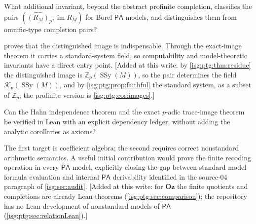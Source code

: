 \documentclass[11pt]{article}
\theoremstyle{definition}
\theoremstyle{remark}
\newcommand{\Oz}{\ensuremath{\mathbf{Oz}}}
\newcommand{\im}{\operatorname{im}}
\newcommand{\Zp}{\mathbb{Z}_p}
\newcommand{\PA}{\mathsf{PA}}
\newcommand{\SSy}{\operatorname{SSy}}
\begin{document}
\begin{question}\label{isg:ptg:q:completions}
What additional invariant, beyond the abstract profinite completion,
classifies the pairs $(\widehat{(R_M)}_p,\im R_M)$ for Borel $\PA$ models,
and distinguishes them from omnific-type completion pairs?
\end{question}
 proves that the distinguished image is
indispensable. Through the exact-image theorem it carries a standard-system
field, so computability and model-theoretic invariants have a direct entry
point. \textup{[}Added at this write: by \cref{isg:ptg:thm:residue} the distinguished image is
$\Zp(\SSy(M))$, so the pair determines the field $\mathcal K_p(\SSy(M))$,
and by \cref{isg:ptg:prop:faithful} the standard system, as a subset of $\Zp$; the profinite
version is \cref{isg:ptg:cor:images}.\textup{]}

\begin{question}\label{isg:ptg:q:lean}
Can the Hahn independence theorem and the exact $p$-adic trace-image
theorem be verified in Lean with an explicit dependency ledger, without
adding the analytic corollaries as axioms?
\end{question}
The first target is coefficient algebra; the second requires correct
nonstandard arithmetic semantics. A useful initial contribution would prove
the finite recoding operation in every $\PA$ model, explicitly closing the
gap between standard-model formula evaluation and internal $\PA$
derivability identified in the source-04 paragraph of
\cref{isg:sec:audit}. \textup{[}Added at this write: for $\Oz$ the finite quotients and
completions are already Lean theorems (\cref{isg:ptg:sec:comparison}); the
repository has no Lean development of nonstandard models of $\PA$
(\cref{isg:ptg:sec:relationLean}).\textup{]}
\end{document}
